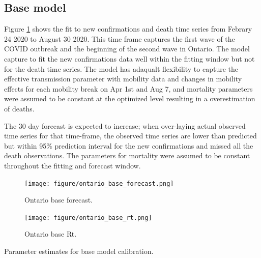\documentclass[12pt]{article}\usepackage[]{graphicx}\usepackage[]{color}
\begin{document}
\subsection{Base model}

Figure \ref{fig:Ont_calibration_base_forecast} shows the fit to new confirmations and death time series from Febrary 24 2020 to August 30 2020. This time frame captures the first wave of the COVID outbreak and the beginning of the second wave in Ontario. The model capture to fit the new confirmations data well within the fitting window but not for the death time series. The model has adaqualt flexibility to capture the effective transmission parameter with mobility data and changes in mobility effects for each mobility break on Apr 1st and Aug 7, and mortality parameters were assumed to be constant at the optimized level resulting in a overestimation of deaths. 

The 30 day forecast is expected to increase; when over-laying actual observed time series for that time-frame, the observed time series are lower than predicted but within 95\% prediction interval for the new confirmations and missed all the death observations. The parameters for mortality were assumed to be constant throughout the fitting and forecast window. 


\begin{figure}[ht!]
\texttt{[image: figure/ontario\_base\_forecast.png]}

\caption{Ontario base forecast. }
\label{fig:Ont_calibration_base_forecast}
\end{figure}

\begin{figure}[ht!]
\texttt{[image: figure/ontario\_base\_rt.png]}

\caption{Ontario base Rt. }
\label{fig:Ont_calibration_base_rt}
\end{figure}

\begin{table}
\centering

\caption{
  \label{tab:estparm}
  Parameter estimates for base model calibration. 
}
\end{table}
\end{document}
